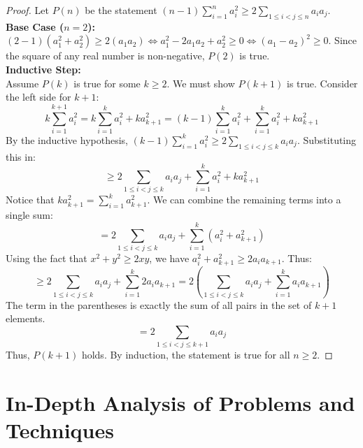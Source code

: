 \documentclass[11pt, a4paper]{article}
\theoremstyle{definition}
\theoremstyle{remark}
\begin{document}
\begin{proof}
Let $P(n)$ be the statement $(n-1)\sum_{i=1}^n a_i^2 \ge 2 \sum_{1 \le i < j \le n} a_i a_j$.
\vspace{4pt} \\
\textbf{Base Case ($n = 2$):} \\
$(2-1)(a_1^2 + a_2^2) \ge 2(a_1 a_2) \iff a_1^2 - 2a_1 a_2 + a_2^2 \ge 0 \iff (a_1 - a_2)^2 \ge 0$. Since the square of any real number is non-negative, $P(2)$ is true.
\vspace{4pt} \\
\textbf{Inductive Step:} \\
Assume $P(k)$ is true for some $k \ge 2$. We must show $P(k+1)$ is true.
Consider the left side for $k+1$:
\[ k \sum_{i=1}^{k+1} a_i^2 = k \sum_{i=1}^k a_i^2 + k a_{k+1}^2 = (k-1)\sum_{i=1}^k a_i^2 + \sum_{i=1}^k a_i^2 + k a_{k+1}^2 \]
By the inductive hypothesis, $(k-1)\sum_{i=1}^k a_i^2 \ge 2 \sum_{1 \le i < j \le k} a_i a_j$. Substituting this in:
\[ \ge 2 \sum_{1 \le i < j \le k} a_i a_j + \sum_{i=1}^k a_i^2 + k a_{k+1}^2 \]
Notice that $k a_{k+1}^2 = \sum_{i=1}^k a_{k+1}^2$. We can combine the remaining terms into a single sum:
\[ = 2 \sum_{1 \le i < j \le k} a_i a_j + \sum_{i=1}^k (a_i^2 + a_{k+1}^2) \]
Using the fact that $x^2 + y^2 \ge 2xy$, we have $a_i^2 + a_{k+1}^2 \ge 2a_i a_{k+1}$. Thus:
\[ \ge 2 \sum_{1 \le i < j \le k} a_i a_j + \sum_{i=1}^k 2a_i a_{k+1} = 2 \left( \sum_{1 \le i < j \le k} a_i a_j + \sum_{i=1}^k a_i a_{k+1} \right) \]
The term in the parentheses is exactly the sum of all pairs in the set of $k+1$ elements.
\[ = 2 \sum_{1 \le i < j \le k+1} a_i a_j \]
Thus, $P(k+1)$ holds. By induction, the statement is true for all $n \ge 2$.
\end{proof}

\newpage

\section{In-Depth Analysis of Problems and Techniques}
\end{document}
